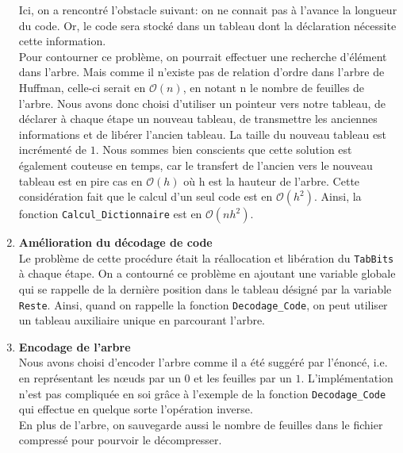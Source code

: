 \documentclass[a4paper,11pt]{article}
\begin{document}
\begin{enumerate}
			Ici, on a rencontré l'obstacle suivant: on ne connait pas à l'avance la longueur du code. Or, le code sera stocké dans un tableau dont la déclaration nécessite cette information.\\
			Pour contourner ce problème, on pourrait effectuer une recherche d'élément dans l'arbre. Mais comme il n'existe pas de relation d'ordre dans l'arbre de Huffman, celle-ci serait en $\mathcal{O}(n)$, en notant n le nombre de feuilles de l'arbre.
			Nous avons donc choisi d'utiliser un pointeur vers notre tableau, de déclarer à chaque étape un nouveau tableau, de transmettre les anciennes informations et de libérer l'ancien tableau. La taille du nouveau tableau est incrémenté de $1$. 
			Nous sommes bien conscients que cette solution est également couteuse en temps, car le transfert de l'ancien vers le nouveau tableau est en pire cas en $\mathcal{O}(h)$ où h est la hauteur de l'arbre. Cette considération fait que le calcul d'un seul code est en $\mathcal{O}(h^2)$. 
			Ainsi, la fonction \verb+Calcul_Dictionnaire+ est en $\mathcal{O}(nh^2)$.
		\item{\textbf{Amélioration du décodage de code}}\\
			Le problème de cette procédure était la réallocation et libération du \verb+TabBits+ à chaque étape. On a contourné ce problème en ajoutant une variable globale qui se rappelle de la dernière position dans le tableau désigné par la variable \verb+Reste+. Ainsi, quand on rappelle la fonction \verb+Decodage_Code+, on peut utiliser un tableau auxiliaire unique en parcourant l'arbre.
		\item{\textbf{Encodage de l'arbre}}\\
			Nous avons choisi d'encoder l'arbre comme il a été suggéré par l'énoncé, i.e. en représentant les n\oe{}uds par un $0$ et les feuilles par un $1$. L'implémentation n'est pas compliquée en soi grâce à l'exemple de la fonction \verb+Decodage_Code+ qui effectue en quelque sorte l'opération inverse.\\
			En plus de l'arbre, on sauvegarde aussi le nombre de feuilles dans le fichier compressé pour pourvoir le décompresser.
	\end{enumerate}
\end{document}
